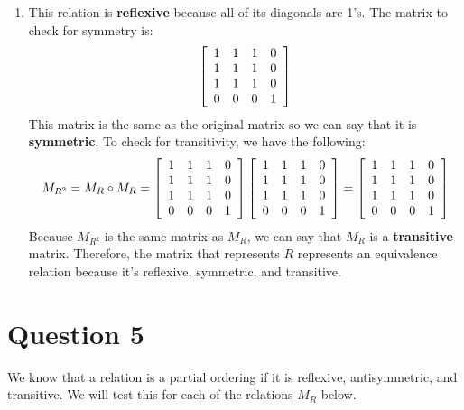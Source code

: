 \documentclass[11pt]{article}
\begin{document}
\begin{enumerate}
    \item This relation is \textbf{reflexive} because all of its diagonals are 1's. The matrix to check for symmetry is:
    \[
    \left[
    \begin{array}{c c c c}
         1 & 1 & 1 & 0 \\
         1 & 1 & 1 & 0 \\
         1 & 1 & 1 & 0 \\
         0 & 0 & 0 & 1
    \end{array}
    \right]
    \]
    This matrix is the same as the original matrix so we can say that it is \textbf{symmetric}. To check for transitivity, we have the following:
    \[
    M_{R^2} = M_R \circ M_R = 
    \left[
    \begin{array}{c c c c}
         1 & 1 & 1 & 0 \\
         1 & 1 & 1 & 0 \\
         1 & 1 & 1 & 0 \\
         0 & 0 & 0 & 1
    \end{array}
    \right]
    \left[
    \begin{array}{c c c c}
         1 & 1 & 1 & 0 \\
         1 & 1 & 1 & 0 \\
         1 & 1 & 1 & 0 \\
         0 & 0 & 0 & 1
    \end{array}
    \right]
    =
    \left[
    \begin{array}{c c c c}
         1 & 1 & 1 & 0 \\
         1 & 1 & 1 & 0 \\
         1 & 1 & 1 & 0 \\
         0 & 0 & 0 & 1
    \end{array}
    \right]
    \]
    Because $M_{R^2}$ is the same matrix as $M_R$, we can say that $M_R$ is a \textbf{transitive} matrix. Therefore, the matrix that represents $R$ represents an equivalence relation because it's reflexive, symmetric, and transitive.
\end{enumerate}

\section*{Question 5}
We know that a relation is a partial ordering if it is reflexive, antisymmetric, and transitive. We will test this for each of the relations $M_R$ below.
\end{document}

